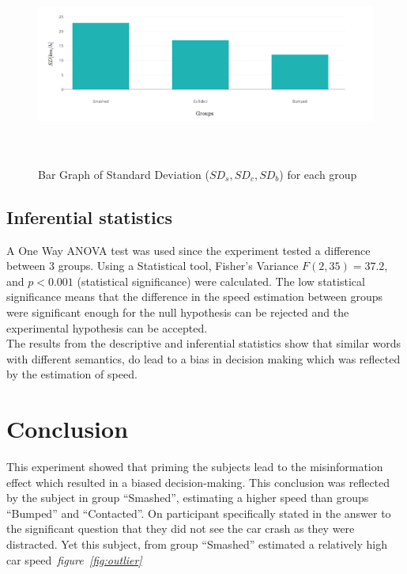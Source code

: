\documentclass[11pt]{article}
\begin{document}
\begin{figure}[H]
  \caption{ ~\\Bar Graph of Standard Deviation ($SD_s, SD_c, SD_b$) for each group} 
  \centering 
  \includegraphics[width=\textwidth]{SD.png}
~\label{fig:SD}
\end{figure}


%
\subsection{Inferential statistics}
A One Way ANOVA test was used since the experiment tested a difference between 3 groups. Using a Statistical tool, Fisher's Variance $F(2,35)=37.2$, and $p<0.001$ (statistical significance)  were calculated.
The low statistical significance means that the difference in the speed estimation between groups were significant enough for the null hypothesis can be rejected and the experimental hypothesis can be accepted.
\\
The results from the descriptive and inferential statistics show that similar words with different semantics, do lead to a bias in decision making which was reflected by the estimation of speed.
\section{Conclusion}
This experiment showed that priming the subjects lead to the misinformation effect which resulted in a biased decision-making. This conclusion was reflected by the subject in group ``Smashed'', estimating a higher speed than groups ``Bumped'' and ``Contacted''.
On participant specifically stated in the answer to the significant question that they did not see the car crash as they were distracted. Yet this subject, from group ``Smashed'' estimated a relatively high car speed~\textit{figure~\ref{fig:outlier}}
\end{document}
